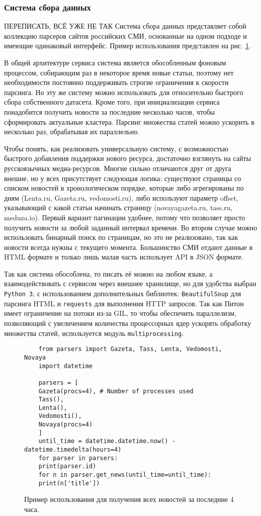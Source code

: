 \documentclass[a4paper, 14pt]{extarticle}
\begin{document}
\subsubsection{Система сбора данных}

{\LARGE ПЕРЕПИСАТЬ, ВСЁ УЖЕ НЕ ТАК}
Система сбора данных представляет собой коллекцию парсеров сайтов российских СМИ, основанные на одном подходе и имеющие одинаковый интерфейс. Пример использования представлен на рис. \ref{example}.

В общей архитектуре сервиса система является обособленным фоновым процессом, собирающим раз в некоторое время новые статьи, поэтому нет необходимости постоянно поддерживать строгие ограничения к скорости парсинга. Но эту же систему можно использовать для относительно быстрого сбора собственного датасета. Кроме того, при инициализации сервиса понадобится получить новости за последние несколько часов, чтобы сформировать актуальные кластера. Парсинг множества статей можно ускорить в несколько раз, обрабатывая их параллельно.

Чтобы понять, как реализовать универсальную систему, с возможностью быстрого добавления поддержки нового ресурса, достаточно взглянуть на сайты русскоязычных медиа-ресурсов. Многие сильно отличаются друг от друга внешне, но у всех присутствует следующая логика: существуют страницы со списком новостей в хронологическом порядке, которые либо агрегированы по дням (Lenta.ru, Gazeta.ru, vedomosti.ru), либо используют параметр offset, указывающий с какой статьи начинать страницу (novayagazeta.ru, tass.ru, meduza.io). Первый вариант пагинации удобнее, потому что позволяет просто получить новости за любой заданный интервал времени. Во втором случае можно использовать бинарный поиск по страницам, но это не реализовано, так как новости всегда нужны с текущего момента.
Большинство СМИ отдают данные в HTML формате и только лишь малая часть использует API в JSON формате.

Так как система обособлена, то писать её можно на любом языке, а взаимодействовать с сервисом через внешнее хранилище, но для удобства выбран \texttt{Python 3}, с использованием дополнительных библиотек: \texttt{BeautifulSoup} для парсинга HTML и \texttt{requests} для выполнения HTTP запросов. Так как Питон имеет ограничение на потоки из-за GIL, то чтобы обеспечить параллелизм, позволяющий с увеличением количества процессорных ядер ускорять обработку множества статей, используется модуль \texttt{multiprocessing}.

\begin{figure}
	\centering
	\begin{verbatim}
	from parsers import Gazeta, Tass, Lenta, Vedomosti, Novaya
	import datetime
	
	parsers = [
	Gazeta(procs=4), # Number of processes used
	Tass(),
	Lenta(),
	Vedomosti(),
	Novaya(procs=4)
	]
	until_time = datetime.datetime.now() - datetime.timedelta(hours=4)
	for parser in parsers:
	print(parser.id)
	for n in parser.get_news(until_time=until_time):
	print(n['title'])
	\end{verbatim}
	\caption{Пример использования для получения всех новостей за последние 4 часа.}
	\label{example}
\end{figure}
\end{document}
